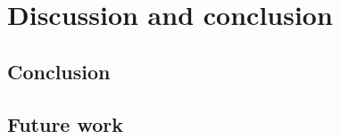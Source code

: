 \chapter{Discussion and conclusion}
\section{Conclusion}\label{sec:concl}
\section{Future work}\label{sec:fw}
